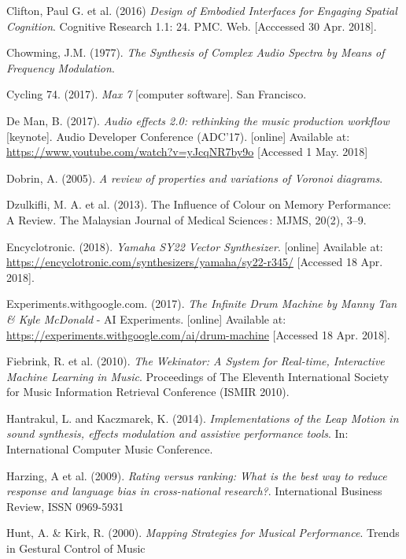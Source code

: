 \documentclass[11pt, oneside]{report}   	%
\begin{document}
{\begin{thebibliography}{9}
Clifton, Paul G. et al. (2016) \emph{Design of Embodied Interfaces for Engaging Spatial Cognition}. Cognitive Research 1.1: 24. PMC. Web. [Acccessed 30 Apr. 2018].

Chowming, J.M. (1977). \emph{The Synthesis of Complex Audio Spectra by Means of Frequency Modulation}.

Cycling 74. (2017). \emph{Max 7} [computer software]. San Francisco.

De Man, B. (2017). \emph{Audio effects 2.0: rethinking the music production workflow} [keynote]. Audio Developer Conference (ADC'17). [online] Available at: \url{https://www.youtube.com/watch?v=yJcqNR7by9o}  [Accessed 1  May. 2018]

Dobrin, A. (2005). \emph{A review of properties and variations of Voronoi diagrams}. 

Dzulkifli, M. A. et al. (2013). The Influence of Colour on Memory Performance: A Review. The Malaysian Journal of Medical Sciences : MJMS, 20(2), 3–9.

Encyclotronic. (2018). \emph{Yamaha SY22 Vector Synthesizer}. [online] Available at: \url{https://encyclotronic.com/synthesizers/yamaha/sy22-r345/} [Accessed 18 Apr. 2018].

Experiments.withgoogle.com. (2017). \emph{The Infinite Drum Machine by Manny Tan \& Kyle McDonald} - AI Experiments. [online] Available at: \url{https://experiments.withgoogle.com/ai/drum-machine} [Accessed 18 Apr. 2018].

Fiebrink, R. et al. (2010). \emph{The Wekinator: A System for Real-time, Interactive Machine Learning in Music}. Proceedings of The Eleventh International Society for Music Information Retrieval Conference (ISMIR 2010). 

Hantrakul, L. and Kaczmarek, K. (2014). \emph{Implementations of the Leap Motion in sound synthesis, effects modulation and assistive performance tools}. In: International Computer Music Conference. 

Harzing, A et al. (2009). \emph{Rating versus ranking: What is the best way to reduce response and language bias in cross-national research?}.
International Business Review,
ISSN 0969-5931

Hunt, A. \& Kirk, R. (2000). \emph{Mapping Strategies for Musical Performance}. Trends in Gestural Control of Music


\end{thebibliography}}
\end{document}

